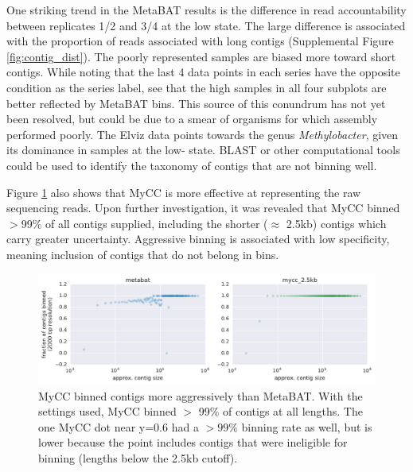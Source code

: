One striking trend in the MetaBAT results is the difference in read accountability between replicates 1/2 and 3/4 at the low  state. %
The large difference is associated with the proportion of reads associated with long contigs (Supplemental Figure \ref{fig:contig_dist}).
The poorly represented samples are biased more toward short contigs.
While noting that the last 4 data points in each series have the opposite  condition as the series label, see that the high  samples in all four subplots are better reflected by MetaBAT bins.
This source of this conundrum has not yet been resolved, but could be due to a smear of organisms for which assembly performed poorly.
The Elviz data points towards the genus \textit{Methylobacter}, given its dominance in samples at the low- state.
BLAST or other computational tools could be used to identify the taxonomy of contigs that are not binning well. %

Figure \ref{fig:mycc_binned_more_contigs} also shows that MyCC is more effective at representing the raw sequencing reads.
Upon further investigation, it was revealed that MyCC binned $>$99\% of all contigs supplied, including the shorter ($\approx$ 2.5kb) contigs which carry greater uncertainty. %
Aggressive binning is associated with low specificity, meaning inclusion of contigs that do not belong in bins. %

\begin{figure}[H]
\centering
    \includegraphics[width=1.0\textwidth]{./tex/chapter2/figures/170206_improved_fracs_of_contigs_binned_by_MyCC.pdf}
    \begin{singlespace}
    \caption[MyCC binned contigs more aggressively than MetaBAT]{
        MyCC binned contigs more aggressively than MetaBAT.
        With the settings used, MyCC binned $>$ 99\% of contigs at all lengths. %
        The one MyCC dot near y=0.6 had a $>99\%$ binning rate as well, but is lower because the point includes contigs that were ineligible for binning (lengths below the 2.5kb cutoff).
        }
    \label{fig:mycc_binned_more_contigs}
    \end{singlespace}
\end{figure}

